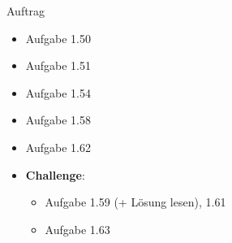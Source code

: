 \begin{frame}{Auftrag}
\begin{itemize}
    \item Aufgabe 1.50
    \item Aufgabe 1.51    
    \item Aufgabe 1.54
    \item Aufgabe 1.58
    \item Aufgabe 1.62
    \item \textbf{Challenge}: 
    \begin{itemize}
        \item Aufgabe 1.59 (+ Lösung lesen), 1.61
        \item Aufgabe 1.63
    \end{itemize}
\end{itemize}
\end{frame}